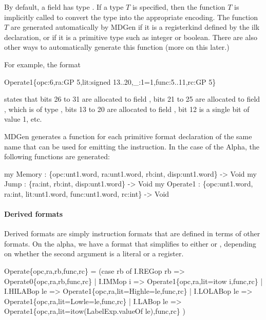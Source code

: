   By default, a field has type .  If a type $T$ 
is specified, then the function $T$ is implicitly called
to convert the type into the appropriate encoding.   The function 
$T$ are generated automatically by MDGen if it is a registerkind
defined by the  ilk declaration, or if it is a primitive
type such as integer or boolean.  
There are also other ways to automatically generate this function
(more on this later.)

  For example, the format 
\begin{SML}
   Operate1\{opc:6,ra:GP 5,lit:signed 13..20,_:1=1,func:5..11,rc:GP 5\} 
\end{SML}
states that bits 26 to 31 are allocated to field , 
bits 21 to 25 are allocated to field , which is of type 
, bits 13 to 20 are allocated to field , bit 12
is a single bit of value 1, etc.


MDGen generates a function for each primitive format declaration of
the same name that can be used for emitting the instruction.  
In the case of the Alpha, the following functions are generated:
\begin{SML}
   my Memory : \{opc:unt1.word, ra:unt1.word, 
                 rb:int, disp:unt1.word\} -> Void
   my Jump   : \{ra:int, rb:int, disp:unt1.word\} -> Void
   my Operate1 : \{opc:unt1.word, ra:int, lit:unt1.word,
                   func:unt1.word, rc:int\} -> Void
\end{SML}

\paragraph{Derived formats}

   Derived formats are simply instruction formats that are defined
in terms of other formats.  On the alpha, we have a 
format that simplifies to either  or ,
depending on whether the second argument is a literal or a register.  
\begin{SML}
   Operate\{opc,ra,rb,func,rc\} =
     (case rb of
       I.REGop rb => Operate0\{opc,ra,rb,func,rc\}
     | I.IMMop i  => Operate1\{opc,ra,lit=itow i,func,rc\}
     | I.HILABop le => Operate1\{opc,ra,lit=High{le=le},func,rc\}
     | I.LOLABop le => Operate1\{opc,ra,lit=Low{le=le},func,rc\}
     | I.LABop le => Operate1\{opc,ra,lit=itow(LabelExp.valueOf le),func,rc\}
     )
\end{SML}

